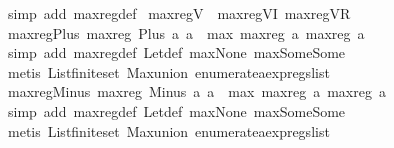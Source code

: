 \begin{isabellebody}
\ {\isacharparenleft}simp\ add{\isacharcolon}\ max{\isacharunderscore}reg{\isacharunderscore}def{\isacharparenright}%
\endisatagproof
{\isafoldproof}%
%
\isadelimproof
\isanewline
%
\endisadelimproof
\isanewline
{}\isamarkupfalse%
\ max{\isacharunderscore}reg{\isacharunderscore}V\ {\isacharequal}\ max{\isacharunderscore}reg{\isacharunderscore}V{\isacharunderscore}I\ max{\isacharunderscore}reg{\isacharunderscore}V{\isacharunderscore}R\isanewline
\isanewline
{}\isamarkupfalse%
\ max{\isacharunderscore}reg{\isacharunderscore}Plus{\isacharcolon}\ {\isachardoublequoteopen}max{\isacharunderscore}reg\ {\isacharparenleft}Plus\ a{}\ a{}{\isacharparenright}\ {\isacharequal}\ max\ {\isacharparenleft}max{\isacharunderscore}reg\ a{}{\isacharparenright}\ {\isacharparenleft}max{\isacharunderscore}reg\ a{}{\isacharparenright}{\isachardoublequoteclose}\isanewline
%
\isadelimproof
\ \ %
\endisadelimproof
%
\isatagproof
{}\isamarkupfalse%
\ {\isacharparenleft}simp\ add{\isacharcolon}\ max{\isacharunderscore}reg{\isacharunderscore}def\ Let{\isacharunderscore}def\ max{\isacharunderscore}None\ max{\isacharunderscore}Some{\isacharunderscore}Some{\isacharparenright}\isanewline
\ \ \isamarkupfalse%
\ {\isacharparenleft}metis\ List{\isachardot}finite{\isacharunderscore}set\ Max{\isachardot}union\ enumerate{\isacharunderscore}aexp{\isacharunderscore}regs{\isacharunderscore}list{\isacharparenright}%
\endisatagproof
{\isafoldproof}%
%
\isadelimproof
\isanewline
%
\endisadelimproof
\isanewline
{}\isamarkupfalse%
\ max{\isacharunderscore}reg{\isacharunderscore}Minus{\isacharcolon}\ {\isachardoublequoteopen}max{\isacharunderscore}reg\ {\isacharparenleft}Minus\ a{}\ a{}{\isacharparenright}\ {\isacharequal}\ max\ {\isacharparenleft}max{\isacharunderscore}reg\ a{}{\isacharparenright}\ {\isacharparenleft}max{\isacharunderscore}reg\ a{}{\isacharparenright}{\isachardoublequoteclose}\isanewline
%
\isadelimproof
\ \ %
\endisadelimproof
%
\isatagproof
{}\isamarkupfalse%
\ {\isacharparenleft}simp\ add{\isacharcolon}\ max{\isacharunderscore}reg{\isacharunderscore}def\ Let{\isacharunderscore}def\ max{\isacharunderscore}None\ max{\isacharunderscore}Some{\isacharunderscore}Some{\isacharparenright}\isanewline
\ \ \isamarkupfalse%
\ {\isacharparenleft}metis\ List{\isachardot}finite{\isacharunderscore}set\ Max{\isachardot}union\ enumerate{\isacharunderscore}aexp{\isacharunderscore}regs{\isacharunderscore}list{\isacharparenright}%

\end{isabellebody}
